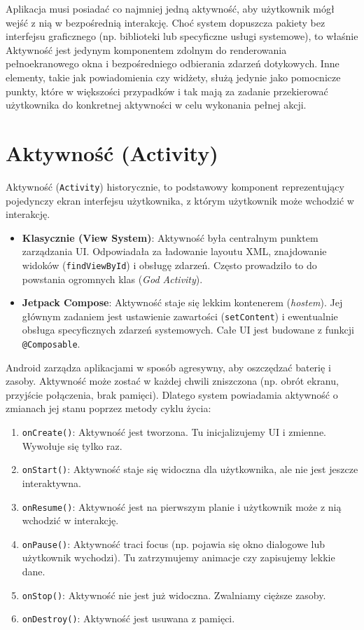 Aplikacja musi posiadać co najmniej jedną aktywność, aby użytkownik mógł wejść z nią w bezpośrednią interakcję. Choć system dopuszcza pakiety bez interfejsu graficznego (np. biblioteki lub specyficzne usługi systemowe), to właśnie Aktywność jest jedynym komponentem zdolnym do renderowania pełnoekranowego okna i bezpośredniego odbierania zdarzeń dotykowych. Inne elementy, takie jak powiadomienia czy widżety, służą jedynie jako pomocnicze punkty, które w większości przypadków i tak mają za zadanie przekierować użytkownika do konkretnej aktywności w celu wykonania pełnej akcji.

\section{Aktywność (Activity)}

Aktywność (\texttt{Activity}) historycznie, to podstawowy komponent reprezentujący pojedynczy ekran interfejsu użytkownika, z którym użytkownik może wchodzić w interakcję.

\begin{itemize}
    \item \textbf{Klasycznie (View System)}: Aktywność była centralnym punktem zarządzania UI. Odpowiadała za ładowanie layoutu XML, znajdowanie widoków (\texttt{findViewById}) i obsługę zdarzeń. Często prowadziło to do powstania ogromnych klas (\textit{God Activity}).
    \item \textbf{Jetpack Compose}: Aktywność staje się lekkim kontenerem (\textit{hostem}). Jej głównym zadaniem jest ustawienie zawartości (\texttt{setContent}) i ewentualnie obsługa specyficznych zdarzeń systemowych. Całe UI jest budowane z funkcji \texttt{@Composable}.
\end{itemize}

Android zarządza aplikacjami w sposób agresywny, aby oszczędzać baterię i zasoby. Aktywność może zostać w każdej chwili zniszczona (np. obrót ekranu, przyjście połączenia, brak pamięci). Dlatego system powiadamia aktywność o zmianach jej stanu poprzez metody cyklu życia:

\begin{enumerate}
    \item \texttt{onCreate()}: Aktywność jest tworzona. Tu inicjalizujemy UI i zmienne. Wywołuje się tylko raz.
    \item \texttt{onStart()}: Aktywność staje się widoczna dla użytkownika, ale nie jest jeszcze interaktywna.
    \item \texttt{onResume()}: Aktywność jest na pierwszym planie i użytkownik może z nią wchodzić w interakcję.
    \item \texttt{onPause()}: Aktywność traci focus (np. pojawia się okno dialogowe lub użytkownik wychodzi). Tu zatrzymujemy animacje czy zapisujemy lekkie dane.
    \item \texttt{onStop()}: Aktywność nie jest już widoczna. Zwalniamy cięższe zasoby.
    \item \texttt{onDestroy()}: Aktywność jest usuwana z pamięci.
\end{enumerate}

